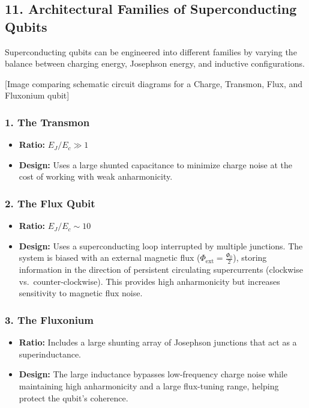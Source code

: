\documentclass[
]{article}
\providecommand{\tightlist}{%
  \setlength{\itemsep}{0pt}\setlength{\parskip}{0pt}}
\begin{document}
\subsection{11. Architectural Families of Superconducting
Qubits}\label{architectural-families-of-superconducting-qubits}

Superconducting qubits can be engineered into different families by
varying the balance between charging energy, Josephson energy, and
inductive configurations.

{[}Image comparing schematic circuit diagrams for a Charge, Transmon,
Flux, and Fluxonium qubit{]}

\subsubsection{1. The Transmon}\label{the-transmon}

\begin{itemize}
\tightlist
\item
  \textbf{Ratio:} \(E_J / E_c \gg 1\)
\item
  \textbf{Design:} Uses a large shunted capacitance to minimize charge
  noise at the cost of working with weak anharmonicity.
\end{itemize}

\subsubsection{2. The Flux Qubit}\label{the-flux-qubit}

\begin{itemize}
\tightlist
\item
  \textbf{Ratio:} \(E_J / E_c \sim 10\)
\item
  \textbf{Design:} Uses a superconducting loop interrupted by multiple
  junctions. The system is biased with an external magnetic flux
  (\(\Phi_{\text{ext}} = \frac{\Phi_0}{2}\)), storing information in the
  direction of persistent circulating supercurrents (clockwise
  vs.~counter-clockwise). This provides high anharmonicity but increases
  sensitivity to magnetic flux noise.
\end{itemize}

\subsubsection{3. The Fluxonium}\label{the-fluxonium}

\begin{itemize}
\tightlist
\item
  \textbf{Ratio:} Includes a large shunting array of Josephson junctions
  that act as a superinductance.
\item
  \textbf{Design:} The large inductance bypasses low-frequency charge
  noise while maintaining high anharmonicity and a large flux-tuning
  range, helping protect the qubit's coherence.
\end{itemize}
\end{document}
